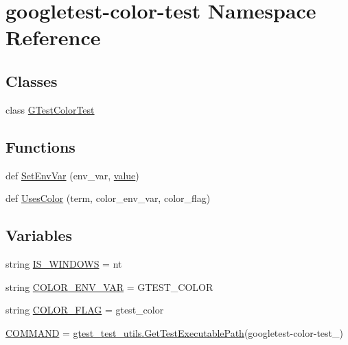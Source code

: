 \hypertarget{namespacegoogletest-color-test}{}\section{googletest-\/color-\/test Namespace Reference}
\label{namespacegoogletest-color-test}
\subsection*{Classes}
\begin{DoxyCompactItemize}
\item 
class \mbox{\hyperlink{classgoogletest-color-test_1_1_g_test_color_test}{G\+Test\+Color\+Test}}
\end{DoxyCompactItemize}
\subsection*{Functions}
\begin{DoxyCompactItemize}
\item 
def \mbox{\hyperlink{namespacegoogletest-color-test_a6892a0e83ce77517fa25534cc2c56210}{Set\+Env\+Var}} (env\+\_\+var, \mbox{\hyperlink{_obj__test_2lib_2googletest-master_2googlemock_2test_2gmock-matchers__test_8cc_a337b8a670efc0b086ad3af163f3121b6}{value}})
\item 
def \mbox{\hyperlink{namespacegoogletest-color-test_a6b0f6528a3b277806378d1b0a7aa09bd}{Uses\+Color}} (term, color\+\_\+env\+\_\+var, color\+\_\+flag)
\end{DoxyCompactItemize}
\subsection*{Variables}
\begin{DoxyCompactItemize}
\item 
string \mbox{\hyperlink{namespacegoogletest-color-test_a07f0b97c52cab5ae5a6b1ad70a76166e}{I\+S\+\_\+\+W\+I\+N\+D\+O\+WS}} = \textquotesingle{}nt\textquotesingle{}
\item 
string \mbox{\hyperlink{namespacegoogletest-color-test_a4ac2cb718d08e0e67fbdd90235860607}{C\+O\+L\+O\+R\+\_\+\+E\+N\+V\+\_\+\+V\+AR}} = \textquotesingle{}G\+T\+E\+S\+T\+\_\+\+C\+O\+L\+OR\textquotesingle{}
\item 
string \mbox{\hyperlink{namespacegoogletest-color-test_ab0f3fdc147b4742a8c797dfa37de9b96}{C\+O\+L\+O\+R\+\_\+\+F\+L\+AG}} = \textquotesingle{}gtest\+\_\+color\textquotesingle{}
\item 
\mbox{\hyperlink{namespacegoogletest-color-test_a4095c8c816acd62b69a8740dcea2bf52}{C\+O\+M\+M\+A\+ND}} = \mbox{\hyperlink{namespacegtest__test__utils_a89ed3717984a80ffbb7a9c92f71b86a2}{gtest\+\_\+test\+\_\+utils.\+Get\+Test\+Executable\+Path}}(\textquotesingle{}googletest-\/color-\/test\+\_\+\textquotesingle{})
\end{DoxyCompactItemize}


